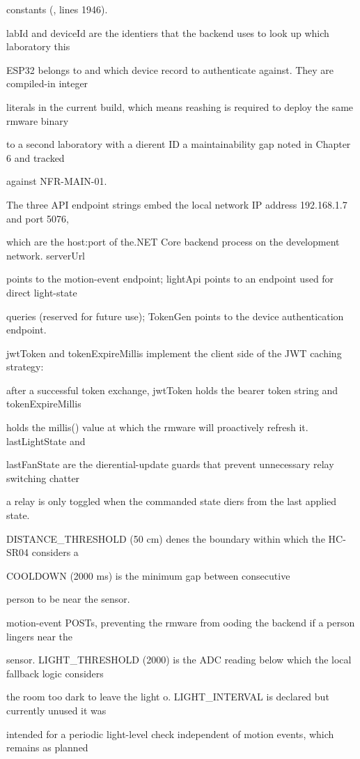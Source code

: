 constants (, lines 1946).

labId and deviceId are the identiers that the backend uses to look up which laboratory this

ESP32 belongs to and which device record to authenticate against. They are compiled-in integer

literals in the current build, which means reashing is required to deploy the same rmware binary

to a second laboratory with a dierent ID  a maintainability gap noted in Chapter 6 and tracked

against NFR-MAIN-01.

The three API endpoint strings embed the local network IP address 192.168.1.7 and port 5076,

which are the host:port of the.NET Core backend process on the development network. serverUrl

points to the motion-event endpoint; lightApi points to an endpoint used for direct light-state

queries (reserved for future use); TokenGen points to the device authentication endpoint.

jwtToken and tokenExpireMillis implement the client side of the JWT caching strategy:

after a successful token exchange, jwtToken holds the bearer token string and tokenExpireMillis

holds the millis() value at which the rmware will proactively refresh it. lastLightState and

lastFanState are the dierential-update guards that prevent unnecessary relay switching chatter

a relay is only toggled when the commanded state diers from the last applied state.

DISTANCE\_THRESHOLD (50 cm) denes the boundary within which the HC-SR04 considers a

COOLDOWN (2000 ms) is the minimum gap between consecutive

person to be near the sensor.

motion-event POSTs, preventing the rmware from ooding the backend if a person lingers near the

sensor. LIGHT\_THRESHOLD (2000) is the ADC reading below which the local fallback logic considers

the room too dark to leave the light o. LIGHT\_INTERVAL is declared but currently unused  it was

intended for a periodic light-level check independent of motion events, which remains as planned

